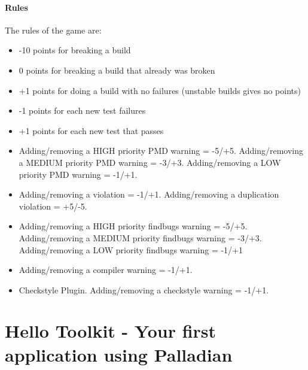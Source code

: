 \documentclass[a4paper,twoside]{book}      %
\begin{document}
\paragraph{Rules}
The rules of the game are:
\begin{itemize}
\item -10 points for breaking a build
\item 0 points for breaking a build that already was broken
\item +1 points for doing a build with no failures (unstable builds gives no points)
\item -1 points for each new test failures
\item +1 points for each new test that passes
\item Adding/removing a HIGH priority PMD warning = -5/+5. Adding/removing a MEDIUM priority PMD warning = -3/+3. Adding/removing a LOW priority PMD warning = -1/+1.
\item Adding/removing a violation = -1/+1. Adding/removing a duplication violation = +5/-5.
\item Adding/removing a HIGH priority findbugs warning = -5/+5. Adding/removing a MEDIUM priority findbugs warning = -3/+3. Adding/removing a LOW priority findbugs warning = -1/+1
\item Adding/removing a compiler warning = -1/+1.
\item Checkstyle Plugin. Adding/removing a checkstyle warning = -1/+1.
\end{itemize}

\section{Hello Toolkit - Your first application using Palladian}
\end{document}
